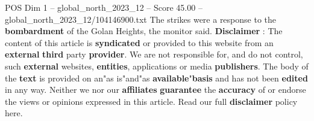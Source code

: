 \begin{textsample}{POS Dim 1 – global\_north\_2023\_12 – Score 45.00 – global\_north\_2023\_12/104146900.txt}
The strikes were a response to the \textbf{bombardment} of the Golan Heights, the monitor said. \textbf{Disclaimer} : The content of this article is \textbf{syndicated} or provided to this website from an \textbf{external} \textbf{third} party \textbf{provider}.
We are not responsible for, and do not control, such \textbf{external} websites, \textbf{entities}, applications or media \textbf{publishers}.
The body of the \textbf{text} is provided on an"as is"and"as \textbf{available}"\textbf{basis} and has not been \textbf{edited} in any way.
Neither we nor our \textbf{affiliates} \textbf{guarantee} the \textbf{accuracy} of or endorse the views or opinions expressed in this article.
Read our full \textbf{disclaimer} policy here.

\end{textsample}
